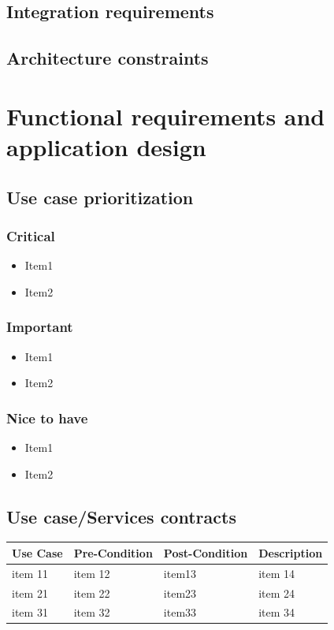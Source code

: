 \documentclass[a4paper,10pt]{article}
\begin{document}
\subsection{Integration requirements}

\subsection{Architecture constraints}

\section{Functional requirements and application design}
\subsection{Use case prioritization}
\subsubsection{Critical}
\begin{itemize}
\item Item1
\item Item2
\end{itemize}

\subsubsection{Important}
\begin{itemize}
\item Item1
\item Item2
\end{itemize}

\subsubsection{Nice to have}
\begin{itemize}
\item Item1
\item Item2
\end{itemize}

\subsection{Use case/Services contracts}
\begin{tabu} to \textwidth { | X[l] | X[l] | X[l] | X[l] | }
	\hline
		Use Case		& Pre-Condition		& Post-Condition		& Description	\\ \hline \hline
		item 11		& item 12			& item13				& item 14  \\ \hline
		item 21		& item 22			& item23				& item 24  \\ \hline
		item 31		& item 32			& item33				& item 34  \\
	\hline
\end{tabu}
\end{document}

